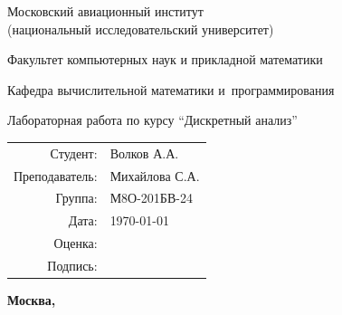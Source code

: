 \begin{titlepage}
\begin{center}
\bfseries

{\Large Московский авиационный институт\\ (национальный исследовательский университет)

}

\vspace{48pt}

{\large Факультет компьютерных наук и прикладной математики
}

\vspace{36pt}

{\large Кафедра вычислительной математики и~программирования

}


\vspace{48pt}

Лабораторная работа  по курсу \enquote{Дискретный анализ}

\end{center}

\vspace{72pt}

\begin{flushright}
\begin{tabular}{rl}
Студент: & Волков А.А. \\ 
Преподаватель: & Михайлова С.А. \\
Группа: & М8О-201БВ-24 \\
Дата: & \today \\
Оценка: & \\
Подпись: & \\
\end{tabular}
\end{flushright}

\vfill

\begin{center}
\bfseries
Москва, \the\year
\end{center}
\end{titlepage}

\pagebreak